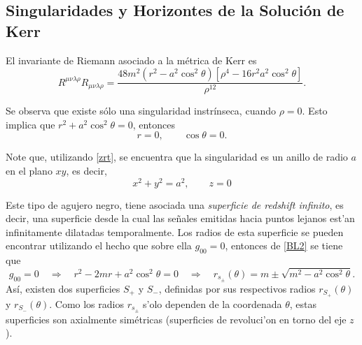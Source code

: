 \subsection{Singularidades y Horizontes de la Soluci\'on de Kerr}

El invariante de Riemann asociado a la m\'etrica de Kerr es
\begin{equation}
R^{\mu \nu \lambda \rho}R_{\mu \nu \lambda \rho}=\frac{48m^2\left(r^2-a^2\cos^2\theta \right)\left[\rho^4-16r^2a^2\cos^2\theta \right]}{\rho^{12}} .
\end{equation}

Se observa que existe s\'olo una singularidad instr\'inseca,  cuando $\rho=0$. Esto implica que $r^2+a^2\cos^2\theta=0$, entonces
$$r=0, \qquad \cos \theta=0.$$

Note que, utilizando \eqref{zrt}, se encuentra que la singularidad es un anillo  de radio $a$ en el plano $xy$, es decir,
\begin{equation}
x^2+y^2=a^2,\qquad z=0
\end{equation}

Este tipo de agujero negro, tiene asociada una \textit{superficie de redshift infinito}, es decir, una superficie desde la cual las se\~nales emitidas hacia puntos lejanos est'an infinitamente dilatadas temporalmente. Los radios de esta superficie se pueden encontrar utilizando el hecho que sobre ella $g_{00}=0$, entonces de \eqref{BL2} se tiene que
\begin{equation} \label{rsk}
g_{00}=0\quad\Rightarrow\quad r^2-2mr+a^2\cos^2 \theta=0 \quad \Rightarrow \quad \boxed{r_{s_{\pm}}(\theta)=m\pm\sqrt{m^2-a^2\cos^2\theta}.}
\end{equation}
As\'i, existen dos superficies $S_{+}$ y $S_{-}$, definidas por sus respectivos radios $r_{S_+}(\theta)$ y $r_{S_{-}}(\theta)$. Como los radios $r_{s_{\pm}}$ s'olo dependen de la coordenada $\theta$, estas superficies son axialmente sim\'etricas (superficies de revoluci'on en torno del eje $z$).

